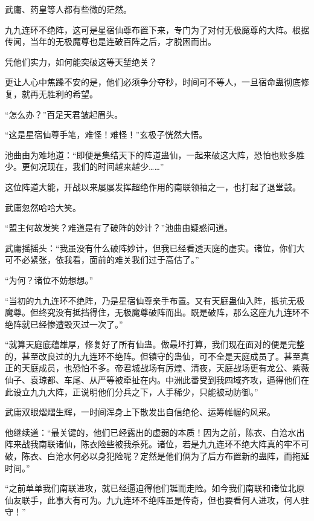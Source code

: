 
\begin{this_body}



武庸、药皇等人都有些微的茫然。

九九连环不绝阵，这可是星宿仙尊布置下来，专门为了对付无极魔尊的大阵。根据传闻，当年的无极魔尊也是连破百阵之后，才脱困而出。

凭他们实力，如何能突破这等天堑绝关？

更让人心中焦躁不安的是，他们必须争分夺秒，时间可不等人，一旦宿命蛊彻底修复，就再无胜利的希望。

“怎么办？”百足天君皱起眉头。

“这是星宿仙尊手笔，难怪！难怪！”玄极子恍然大悟。

池曲由为难地道：“即便是集结天下的阵道蛊仙，一起来破这大阵，恐怕也败多胜少。更何况现在，我们的时间越来越少……”

这位阵道大能，开战以来屡屡发挥超绝作用的南联领袖之一，也打起了退堂鼓。

武庸忽然哈哈大笑。

“盟主何故发笑？难道是有了破阵的妙计？”池曲由疑惑问道。

武庸摇摇头：“我虽没有什么破阵妙计，但我已经看透天庭的虚实。诸位，你们大可不必紧张，依我看，面前的难关我们过于高估了。”

“为何？诸位不妨想想。”

“当初的九九连环不绝阵，乃是星宿仙尊亲手布置。又有天庭蛊仙入阵，抵抗无极魔尊。但终究没有抵挡得住，无极魔尊破阵而出。既是破阵，那么这座九九连环不绝阵就已经惨遭毁灭过一次了。”

“就算天庭底蕴雄厚，修复好了所有仙蛊。做最坏打算，我们现在面对的便是完整的，甚至改良过的九九连环不绝阵。但镇守的蛊仙，可不全是天庭成员了。甚至真正的天庭成员，也恐怕不多。帝君城战场有厉煌、清夜，天庭战场更有龙公、紫薇仙子、袁琼都、车尾、从严等被牵扯在内。中洲此番受到我四域齐攻，逼得他们在此设立九九大阵，正说明他们分兵之下，人手稀少，只能被动防御。”

武庸双眼熠熠生辉，一时间浑身上下散发出自信绝伦、运筹帷幄的风采。

他继续道：“最关键的，他们已经露出的虚弱的本质！因为之前，陈衣、白沧水出阵来战我南联诸仙，陈衣险些被我杀死。诸位，若是九九连环不绝大阵真的牢不可破，陈衣、白沧水何必以身犯险呢？定然是他们俩为了后方布置新的蛊阵，而拖延时间。”

“之前单单我们南联进攻，就已经逼迫得他们铤而走险。如今我们南联和诸位北原仙友联手，此事大有可为。九九连环不绝阵虽是传奇，但也要看何人进攻，何人驻守！”


\end{this_body}
